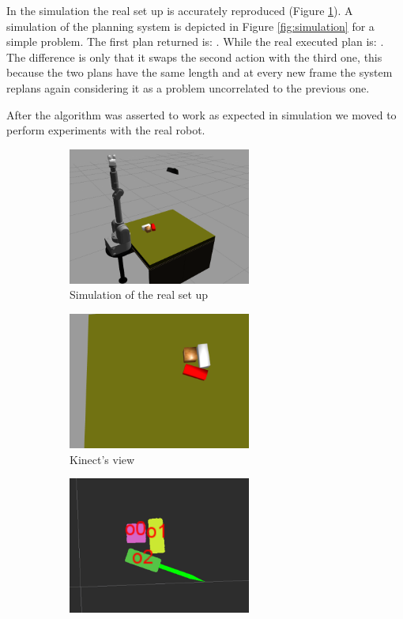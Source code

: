 In the simulation the real set up is accurately reproduced (Figure \ref{fig:sim_setup}). A simulation of the planning system is depicted in Figure \ref{fig:simulation} for a simple problem.
The first plan returned is: . While the real executed plan is: . The difference is only that it swaps the second action with the third one, this because the two plans have the same length and at every new frame the system replans again considering it as a problem uncorrelated to the previous one. 

After the algorithm was asserted to work as expected in simulation we moved to perform experiments with the real robot. 

\begin{figure}
\centering
\begin{subfigure}[h]{0.45\textwidth}
\centering
\includegraphics[width=6cm]{Img/simulation/setup_sim.png}
\caption{Simulation of the real set up}\label{fig:sim_setup}
\end{subfigure}
\begin{subfigure}[h]{0.45\textwidth}
\centering
\includegraphics[width=6cm]{Img/simulation/image.png}
\caption{Kinect's view}
\label{fig:sim_kinect}
\end{subfigure}
\begin{subfigure}[h]{0.45\textwidth}
\centering
\includegraphics[width=6cm]{Img/simulation/action1.png}

\end{subfigure}
\end{figure}

